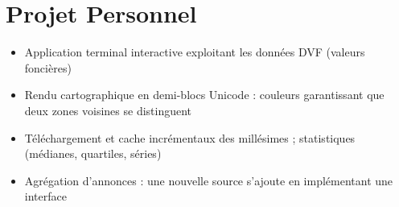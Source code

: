 \section*{ Projet Personnel}

\begin{itemize}[leftmargin=*, itemsep=0.5pt, topsep=1pt, label={\cvbullet}]
  \item Application terminal interactive exploitant les données DVF (valeurs foncières)
  \item Rendu cartographique en demi-blocs Unicode : couleurs garantissant que deux zones voisines se distinguent
  \item Téléchargement et cache incrémentaux des millésimes ; statistiques (médianes, quartiles, séries)
  \item Agrégation d'annonces : une nouvelle source s'ajoute en implémentant une interface
\end{itemize}
\vspace{\cvitemsep}
